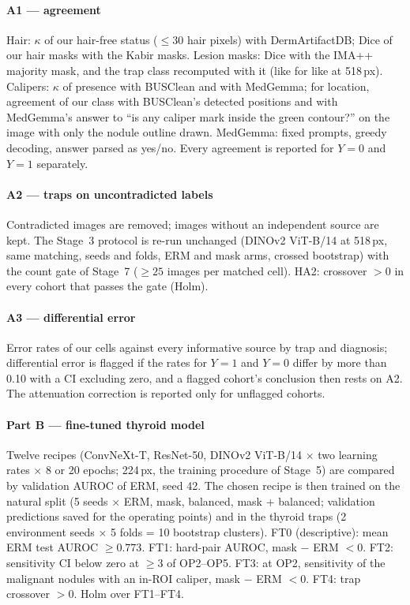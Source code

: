 \paragraph{A1 --- agreement} Hair: $\kappa$ of our hair-free status ($\le30$ hair pixels) with DermArtifactDB; Dice of our
hair masks with the Kabir masks. Lesion masks: Dice with the IMA++ majority mask, and the trap class recomputed with it
(like for like at 518\,px). Calipers: $\kappa$ of presence with BUSClean and with MedGemma; for location, agreement of
our class with BUSClean's detected positions and with MedGemma's answer to ``is any caliper mark inside the green
contour?'' on the image with only the nodule outline drawn. MedGemma: fixed prompts, greedy decoding, answer parsed as
yes/no. Every agreement is reported for $Y=0$ and $Y=1$ separately.
\paragraph{A2 --- traps on uncontradicted labels} Contradicted images are removed; images without an independent source
are kept. The Stage~3 protocol is re-run unchanged (DINOv2 ViT-B/14 at 518\,px, same matching, seeds and folds, ERM and
mask arms, crossed bootstrap) with the count gate of Stage~7 ($\ge25$ images per matched cell). HA2: crossover $>0$ in
every cohort that passes the gate (Holm).
\paragraph{A3 --- differential error} Error rates of our cells against every informative source by trap and diagnosis;
differential error is flagged if the rates for $Y=1$ and $Y=0$ differ by more than 0.10 with a CI excluding zero, and a
flagged cohort's conclusion then rests on A2. The attenuation correction is reported only for unflagged cohorts.
\paragraph{Part B --- fine-tuned thyroid model} Twelve recipes (ConvNeXt-T, ResNet-50, DINOv2 ViT-B/14 $\times$ two
learning rates $\times$ 8 or 20 epochs; 224\,px, the training procedure of Stage~5) are compared by validation AUROC of
ERM, seed 42. The chosen recipe is then trained on the natural split (5 seeds $\times$ ERM, mask, balanced, mask +
balanced; validation predictions saved for the operating points) and in the thyroid traps (2 environment seeds $\times$ 5
folds = 10 bootstrap clusters). FT0 (descriptive): mean ERM test AUROC $\ge0.773$. FT1: hard-pair AUROC, mask $-$ ERM $<0$.
FT2: sensitivity CI below zero at $\ge3$ of OP2--OP5. FT3: at OP2, sensitivity of the malignant nodules with an in-ROI
caliper, mask $-$ ERM $<0$. FT4: trap crossover $>0$. Holm over FT1--FT4.
